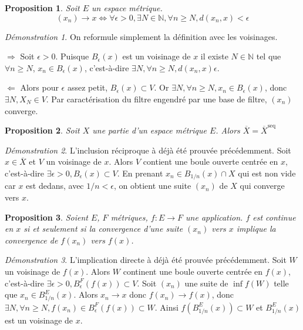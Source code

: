 \documentclass[a4paper, 11pt, french]{book}
\newenvironment{itemise}{\itemize}{\enditemize}
\theoremstyle{plain} %
\newtheorem{proposition}{Proposition}
\theoremstyle{definition} %
\theoremstyle{remark} %
\newtheorem*{demonstration}{Démonstration}
\newcommand{\1}{\mathds{1}}
\newcommand{\N}{\mathbb{N}}
\renewcommand{\rm}[1]{\mathrm{#1}}
\newcommand\equivalence[3]{
	\begin{demonstration}
		#1
		\begin{itemise}
			\item[$\Longrightarrow$] #2
			\item[$\Longleftarrow$] #3
		\end{itemise}
	\end{demonstration}
}
\begin{document}
\begin{proposition}
	Soit $E$ un espace métrique.
	$$
	(x_n)\longrightarrow x
	\iff
	\forall\epsilon>0, \exists N\in\N, \forall n\geqslant N, d(x_n, x)<\epsilon
	$$
\end{proposition}

\equivalence{
	On reformule simplement la définition avec les voisinages.
}{
	Soit $\epsilon>0$.
	Puisque $B_\epsilon(x)$ est un voisinage de $x$ il existe $N\in\N$ tel que $\forall n\geqslant N$, $x_n\in B_\epsilon(x)$, c’est-à-dire $\exists N, \forall n\geqslant N, d(x_n, x)\epsilon$.
}{
	Alors pour $\epsilon$ assez petit, $B_\epsilon(x)\subset V$.
	Or $\exists N, \forall n\geqslant N, x_n\in B_\epsilon(x)$, donc $\exists N, X_N\in V$.
	Par caractérisation du filtre engendré par une base de filtre, $(x_n)$ converge.	
}

\begin{proposition}
	Soit $X$ une partie d'un espace métrique $E$.
	Alors $\overline{X}=\overline{X}^\rm{seq}$
\end{proposition}

\begin{demonstration}
	L'inclusion réciproque à déjà été prouvée précédemment.
	Soit $x\in\overline{X}$ et $V$ un voisinage de $x$.
	Alors $V$ contient une boule ouverte centrée en $x$, c'est-à-dire $\exists\epsilon>0, B_\epsilon(x)\subset V$.
	En prenant $x_n\in B_{1/n}(x)\cap X$ qui est non vide car $x$ est dedans, avec $1/n<\epsilon$, on obtient une suite $(x_n)$ de $X$ qui converge vers $x$.
\end{demonstration}

\begin{proposition}
	Soient $E$, $F$ métriques, $f:E\rightarrow F$ une application.
	$f$ est continue en $x$ si et seulement si la convergence d'une suite $(x_n)$ vers $x$ implique la convergence de $f(x_n)$ vers $f(x)$.
\end{proposition}

\begin{demonstration}
	L'implication directe à déjà été prouvée précédemment.
	Soit $W$ un voisinage de $f(x)$.
	Alors $W$ continent une boule ouverte centrée en $f(x)$, c'est-à-dire $\exists\epsilon>0, B^F_\epsilon(f(x))\subset V$.
	Soit $(x_n)$ une suite de $\inf{f}(W)$ telle que $x_n\in B^E_{1/n}(x)$.
	Alors $x_n\rightarrow x$ donc $f(x_n)\rightarrow f(x)$, donc $\exists N, \forall n\geqslant N, f(x_n)\in B^F_\epsilon(f(x))\subset W$.
	Ainsi $f(B^E_{1/n}(x))\subset W$ et $B^E_{1/n}(x)$ est un voisinage de $x$.
\end{demonstration}
\end{document}
